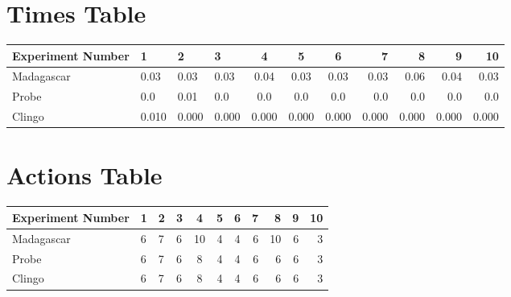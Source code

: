 \documentclass[8pt]{article}
\begin{document}
\begin{landscape}
\section{Times Table}\begin{tabular}{ | l | l | l | l | c | c | c | r | r | r | r | }\hline
Experiment Number & 1 & 2 & 3 & 4 & 5 & 6 & 7 & 8 & 9 & 10\\  \hline
Madagascar & 0.03 & 0.03 & 0.03 & 0.04 & 0.03 & 0.03 & 0.03 & 0.06 & 0.04 & 0.03\\  \hline
Probe & 0.0 & 0.01 & 0.0 & 0.0 & 0.0 & 0.0 & 0.0 & 0.0 & 0.0 & 0.0\\  \hline
Clingo & 0.010 & 0.000 & 0.000 & 0.000 & 0.000 & 0.000 & 0.000 & 0.000 & 0.000 & 0.000\\  \hline
\end{tabular}
\section{Actions Table}\begin{tabular}{ | l | l | l | l | c | c | c | r | r | r | r | }\hline
Experiment Number & 1 & 2 & 3 & 4 & 5 & 6 & 7 & 8 & 9 & 10\\ \hline
 Madagascar & 6 & 7 & 6 & 10 & 4 & 4 & 6 & 10 & 6 & 3\\ \hline
 Probe & 6 & 7 & 6 & 8 & 4 & 4 & 6 & 6 & 6 & 3\\ \hline
 Clingo & 6 & 7 & 6 & 8 & 4 & 4 & 6 & 6 & 6 & 3\\ \hline
\end{tabular}
\end{landscape}
\end{document}
